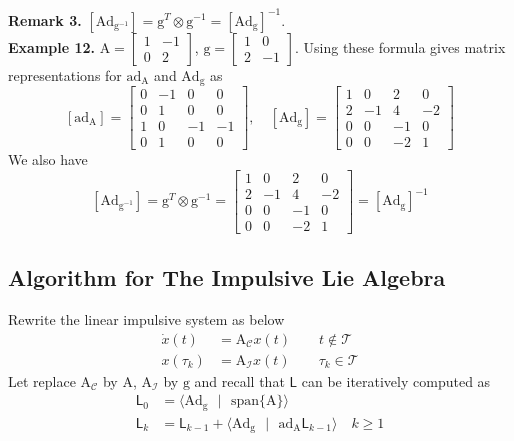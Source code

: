\documentclass[11pt,a4paper]{article}
\begin{document}
\textbf{Remark 3.} $[\mathrm{Ad}_{\mathrm{g}^{-1}}] = \mathrm{g}^{T} \otimes \mathrm{g}^{-1} = [\mathrm{Ad}_{\mathrm{g}}]^{-1}$.\\

\textbf{Example 12.}
$\mathrm{A} = 
	\begin{bmatrix}
 		1 & -1 \\
 		0 & 2
 	\end{bmatrix}
 	$, \quad $ \mathrm{g} = 
	\begin{bmatrix}
 		1 & 0 \\
 		2 & -1
 	\end{bmatrix}.$
Using these formula gives matrix representations for $\mathrm{ad}_{\mathrm{A}}$ and $\mathrm{Ad}_{\mathrm{g}}$ as \\
$$
	[\mathrm{ad}_{\mathrm{A}}] = 
	\begin{bmatrix}
 		0 & -1 &  0 &  0 \\
 		0 &  1 &  0 &  0 \\
 		1 &  0 & -1 & -1 \\
 		0 &  1 &  0 &  0 
 	\end{bmatrix}
 	, \quad
 	[\mathrm{Ad}_{\mathrm{g}}] = 
	\begin{bmatrix}
 		1 &  0 &  2 &  0 \\
 		2 & -1 &  4 & -2 \\
 		0 &  0 & -1 &  0 \\
 		0 &  0 & -2 &  1 
 	\end{bmatrix}
$$
We also have
$$[\mathrm{Ad}_{\mathrm{g}^{-1}}] = \mathrm{g}^{T} \otimes \mathrm{g}^{-1} = 
\begin{bmatrix}
 		1 &  0 &  2 &  0 \\
 		2 & -1 &  4 & -2 \\
 		0 &  0 & -1 &  0 \\
 		0 &  0 & -2 &  1 
 	\end{bmatrix}
=	
 	[\mathrm{Ad}_{\mathrm{g}}]^{-1}
$$
\pagebreak
%
\subsection{Algorithm for The Impulsive Lie Algebra}
\qquad Rewrite the linear impulsive system as below
\begin{align*}
\dot{x}(t) &= \mathrm{A}_\mathcal{C}x(t) \qquad t \notin \mathcal{T} \\
 x(\tau_k) &= \mathrm{A}_\mathcal{I}x(t) \qquad \tau_k \in \mathcal{T} 
\end{align*}
Let replace $\mathrm{A}_\mathcal{C}$ by $\mathrm{A}$, $\mathrm{A}_\mathcal{I}$ by $\mathrm{g}$ and recall that $\mathsf{L}$ can be iteratively computed as
\begin{align*}
\mathsf{L}_0 &= \langle \mathrm{Ad}_{\mathrm{g}} \text{ }| \text{ } \mathrm{span}\{\mathrm{A}\} \rangle \\
\mathsf{L}_k &= \mathsf{L}_{k-1} + \langle \mathrm{Ad}_{\mathrm{g}} \text{ }| \text{ } \mathrm{ad}_{\mathrm{A}}\mathsf{L}_{k-1} \rangle \quad k \geq 1
\end{align*}
\end{document}
